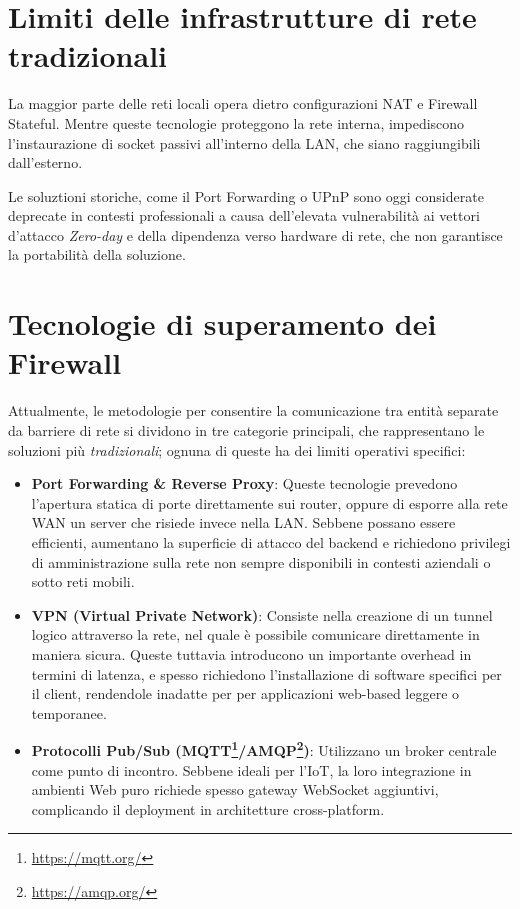 \documentclass[a4paper, 11pt, twoside]{report}
\begin{document}
\newpage

\section{Limiti delle infrastrutture di rete tradizionali}

La maggior parte delle reti locali opera dietro configurazioni \gls{NAT} e \gls{Firewall} Stateful. Mentre queste tecnologie
proteggono la rete interna, impediscono l'instaurazione di socket passivi all'interno della \gls{LAN}, che siano raggiungibili
dall'esterno.

Le soluztioni storiche, come il Port Forwarding o UPnP sono oggi considerate deprecate in contesti professionali a causa
dell'elevata vulnerabilità ai vettori d'attacco \textit{Zero-day} e della dipendenza verso hardware di rete, che
non garantisce la portabilità della soluzione.

\section{Tecnologie di superamento dei \gls{Firewall}}

Attualmente, le metodologie per consentire la comunicazione tra entità separate da barriere di rete si dividono
in tre categorie principali, che rappresentano le soluzioni più \textit{tradizionali}; ognuna di queste ha dei limiti
operativi specifici:

\begin{itemize}

\item\textbf{Port Forwarding \& Reverse Proxy}: Queste tecnologie prevedono l'apertura statica di porte direttamente sui
    router, oppure di esporre alla rete \gls{WAN} un server che risiede invece nella \gls{LAN}. Sebbene possano essere efficienti,
    aumentano la superficie di attacco del backend e richiedono privilegi di amministrazione sulla rete non sempre
    disponibili in contesti aziendali o sotto reti mobili.

\item\textbf{VPN (Virtual Private Network)}: Consiste nella creazione di un tunnel logico attraverso la rete, nel quale
    è possibile comunicare direttamente in maniera sicura. Queste tuttavia introducono un importante overhead in termini
    di latenza, e spesso richiedono l'installazione di software specifici per il client, rendendole inadatte per
    per applicazioni web-based leggere o temporanee.

\item\textbf{Protocolli Pub/Sub (\gls{MQTT}\footnote{\url{https://mqtt.org/}}/AMQP\footnote{\url{https://amqp.org/}})}: 
    Utilizzano un broker centrale come punto di incontro. Sebbene ideali per l'IoT, la loro integrazione in ambienti
    Web puro richiede spesso gateway \gls{WebSocket} aggiuntivi, complicando il deployment in architetture cross-platform.

\end{itemize}
\end{document}
